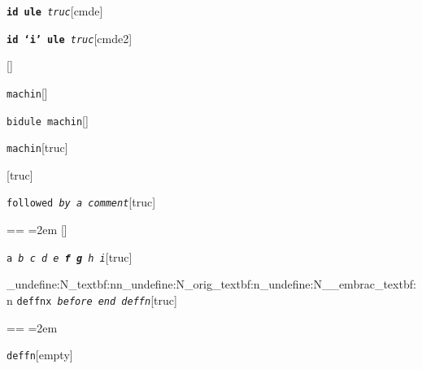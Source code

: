 \documentclass{book}
\makeatletter
\newenvironment{GNUTexinfopreformatted}{%
  \par\obeylines\obeyspaces\frenchspacing
  \parskip=\z@\parindent=\z@}{}
\makeatother
\begin{document}
%
\noindent\texttt{\textbf{id ule} \EmbracOn{}\textnormal{\textsl{truc}}\EmbracOff{}}\hfill[cmde]



%
\noindent\texttt{\textbf{id `\texttt{i}' ule} \EmbracOn{}\textnormal{\textsl{truc}}\EmbracOff{}}\hfill[cmde2]



%
\noindent\texttt{}\hfill[]



\noindent\texttt{machin}\hfill[]



%
\noindent\texttt{bidule machin}\hfill[]



%
\noindent\texttt{machin}\hfill[truc]



%
\noindent\texttt{}\hfill[truc]



\noindent\texttt{followed \EmbracOn{}\textnormal{\textsl{by a comment}}\EmbracOff{}}\hfill[truc]



%
\begin{GNUTexinfopreformatted}
\leftskip=2em\relax\ttfamily%
\end{GNUTexinfopreformatted}
\noindent\texttt{}\hfill[]



\noindent\texttt{a \EmbracOn{}\textnormal{\textsl{b c d e \textbf{f g} h i}}\EmbracOff{}}\hfill[truc]


\ExplSyntaxOn%
\cs_undefine:N{\embrac_textbf:nn}\cs_undefine:N{\embrac_orig_textbf:n}\cs_undefine:N{\__embrac_textbf:n}%
\ExplSyntaxOff%
%
\noindent\texttt{deffnx \EmbracOn{}\textnormal{\textsl{before end deffn}}\EmbracOff{}}\hfill[truc]



%
\begin{GNUTexinfopreformatted}
\leftskip=2em\relax\ttfamily%


\end{GNUTexinfopreformatted}
\noindent\texttt{deffn}\hfill[empty]
\end{document}
